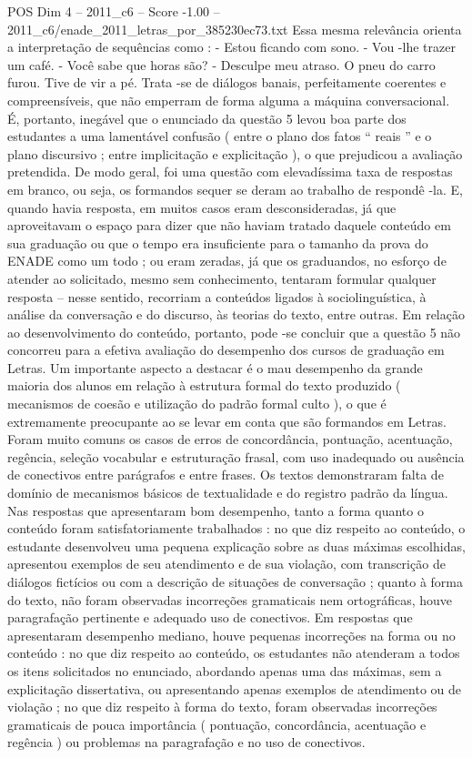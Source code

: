 \begin{textsample}{POS Dim 4 – 2011\_c6 – Score -1.00 – 2011\_c6/enade\_2011\_letras\_por\_385230ec73.txt}
Essa mesma relevância orienta a interpretação de sequências como : - Estou ficando com sono. - Vou -lhe trazer um café. - Você sabe que horas são? - Desculpe meu atraso.
O pneu do carro furou.
Tive de vir a pé.
Trata -se de diálogos banais, perfeitamente coerentes e compreensíveis, que não emperram de forma alguma a máquina conversacional.
É, portanto, inegável que o enunciado da questão 5 levou boa parte dos estudantes a uma lamentável confusão ( entre o plano dos fatos “ reais ” e o plano discursivo ; entre implicitação e explicitação ), o que prejudicou a avaliação pretendida.
De modo geral, foi uma questão com elevadíssima taxa de respostas em branco, ou seja, os formandos sequer se deram ao trabalho de respondê -la.
E, quando havia resposta, em muitos casos eram desconsideradas, já que aproveitavam o espaço para dizer que não haviam tratado daquele conteúdo em sua graduação ou que o tempo era insuficiente para o tamanho da prova do ENADE como um todo ; ou eram zeradas, já que os graduandos, no esforço de atender ao solicitado, mesmo sem conhecimento, tentaram formular qualquer resposta – nesse sentido, recorriam a conteúdos ligados à sociolinguística, à análise da conversação e do discurso, às teorias do texto, entre outras.
Em relação ao desenvolvimento do conteúdo, portanto, pode -se concluir que a questão 5 não concorreu para a efetiva avaliação do desempenho dos cursos de graduação em Letras.
Um importante aspecto a destacar é o mau desempenho da grande maioria dos alunos em relação à estrutura formal do texto produzido ( mecanismos de coesão e utilização do padrão formal culto ), o que é extremamente preocupante ao se levar em conta que são formandos em Letras.
Foram muito comuns os casos de erros de concordância, pontuação, acentuação, regência, seleção vocabular e estruturação frasal, com uso inadequado ou ausência de conectivos entre parágrafos e entre frases.
Os textos demonstraram falta de domínio de mecanismos básicos de textualidade e do registro padrão da língua.
Nas respostas que apresentaram bom desempenho, tanto a forma quanto o conteúdo foram satisfatoriamente trabalhados : no que diz respeito ao conteúdo, o estudante desenvolveu uma pequena explicação sobre as duas máximas escolhidas, apresentou exemplos de seu atendimento e de sua violação, com transcrição de diálogos fictícios ou com a descrição de situações de conversação ; quanto à forma do texto, não foram observadas incorreções gramaticais nem ortográficas, houve paragrafação pertinente e adequado uso de conectivos.
Em respostas que apresentaram desempenho mediano, houve pequenas incorreções na forma ou no conteúdo : no que diz respeito ao conteúdo, os estudantes não atenderam a todos os itens solicitados no enunciado, abordando apenas uma das máximas, sem a explicitação dissertativa, ou apresentando apenas exemplos de atendimento ou de violação ; no que diz respeito à forma do texto, foram observadas incorreções gramaticais de pouca importância ( pontuação, concordância, acentuação e regência ) ou problemas na paragrafação e no uso de conectivos.

\end{textsample}
